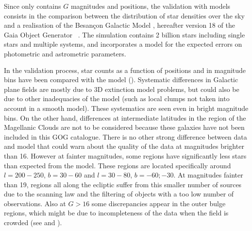 Since {} only contains $G$ magnitudes and positions, the validation with models consists in the comparison between the distribution of star densities over the sky and a realisation of the Besan\c{c}on Galactic Model \citep[BGM,][]{bgm}, hereafter version 18 of the Gaia Object Generator ~\citep[GOG18, ][]{2014A&A...566A.119L}. The simulation contains 2 billion stars including single stars and multiple systems, and incorporates a model for the expected errors on {\gaia} photometric and astrometric parameters. %

In the validation process, star counts as a function of positions and in magnitude bins have been compared with the model (). Systematic differences in Galactic plane fields are mostly due to 3D extinction model problems, but could also be due to other inadequacies of the model (such as local clumps not taken into account in a smooth model). These systematics are seen even in bright magnitude bins. On the other hand, differences at intermediate latitudes in the region of the Magellanic Clouds are not to be considered because these galaxies have not been included in this GOG catalogue. 
There is no other strong difference between data and model that could warn about the quality of the data at magnitudes brighter than 16. However at fainter magnitudes, some regions have significantly less stars than expected from the model. These regions are located specifically around $l=200-250${\deg}, $b=30-60${\deg} and $l=30-80${\deg}, $b=-60;-30${\deg}. At magnitudes fainter than 19, regions all along the ecliptic suffer from this smaller number of sources due to the scanning law and the filtering of objects with a too low number of observations. 
Also at $G>16$ some discrepancies appear in the outer bulge regions, which might be due to incompleteness of the data when the field is crowded (see  and ).


